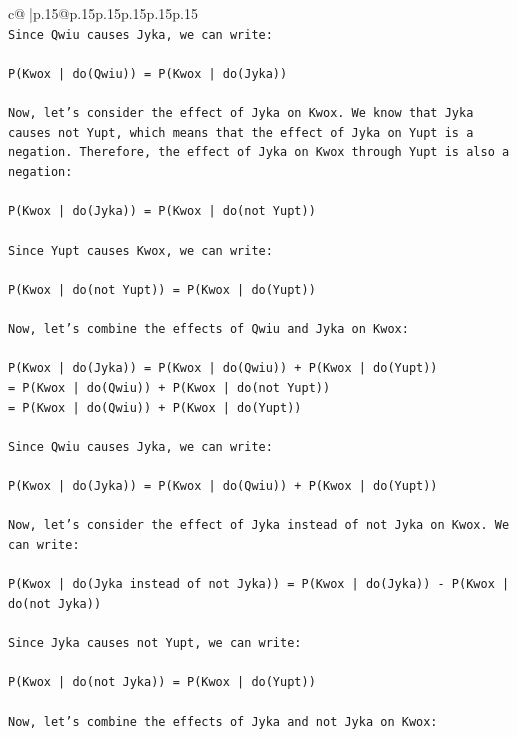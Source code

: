 \documentclass{article}
\begin{document}
{\begin{supertabular}{c@{$\;$}|p{.15\linewidth}@{}p{.15\linewidth}p{.15\linewidth}p{.15\linewidth}p{.15\linewidth}p{.15\linewidth}}
{{{\\ 
\texttt{Since Qwiu causes Jyka, we can write:} \\
\\ 
\texttt{P(Kwox | do(Qwiu)) = P(Kwox | do(Jyka))} \\
\\ 
\texttt{Now, let's consider the effect of Jyka on Kwox. We know that Jyka causes not Yupt, which means that the effect of Jyka on Yupt is a negation. Therefore, the effect of Jyka on Kwox through Yupt is also a negation:} \\
\\ 
\texttt{P(Kwox | do(Jyka)) = P(Kwox | do(not Yupt))} \\
\\ 
\texttt{Since Yupt causes Kwox, we can write:} \\
\\ 
\texttt{P(Kwox | do(not Yupt)) = P(Kwox | do(Yupt))} \\
\\ 
\texttt{Now, let's combine the effects of Qwiu and Jyka on Kwox:} \\
\\ 
\texttt{P(Kwox | do(Jyka)) = P(Kwox | do(Qwiu)) + P(Kwox | do(Yupt))} \\
\texttt{= P(Kwox | do(Qwiu)) + P(Kwox | do(not Yupt))} \\
\texttt{= P(Kwox | do(Qwiu)) + P(Kwox | do(Yupt))} \\
\\ 
\texttt{Since Qwiu causes Jyka, we can write:} \\
\\ 
\texttt{P(Kwox | do(Jyka)) = P(Kwox | do(Qwiu)) + P(Kwox | do(Yupt))} \\
\\ 
\texttt{Now, let's consider the effect of Jyka instead of not Jyka on Kwox. We can write:} \\
\\ 
\texttt{P(Kwox | do(Jyka instead of not Jyka)) = P(Kwox | do(Jyka)) {-} P(Kwox | do(not Jyka))} \\
\\ 
\texttt{Since Jyka causes not Yupt, we can write:} \\
\\ 
\texttt{P(Kwox | do(not Jyka)) = P(Kwox | do(Yupt))} \\
\\ 
\texttt{Now, let's combine the effects of Jyka and not Jyka on Kwox:} \\
\\ 
}}}
\end{supertabular}}
\end{document}

